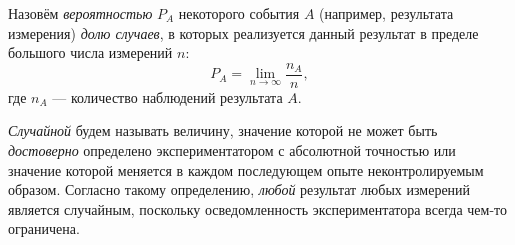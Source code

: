 

Назовём \emph{вероятностью} $P_A$ некоторого события $A$
(например, результата измерения) \emph{долю случаев}, в которых реализуется
данный результат в пределе большого числа измерений $n$:
\[
P_A = \lim_{n\to \infty} \frac{n_A}{n},
\]
где $n_A$ --- количество наблюдений результата $A$.

\emph{Случайной} будем называть величину, значение которой не может быть
\emph{достоверно} определено экспериментатором с абсолютной точностью или
значение которой меняется в каждом последующем опыте неконтролируемым образом.
Согласно такому определению, \emph{любой} результат любых измерений является
случайным, поскольку осведомленность экспериментатора всегда чем-то ограничена.



